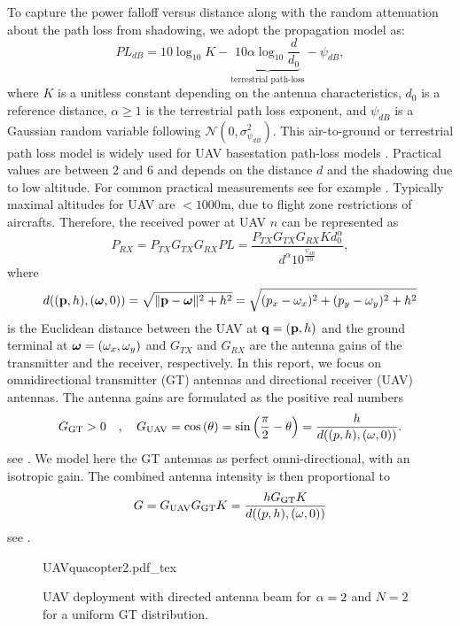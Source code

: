 \documentclass[smallabstract,smallcaptions]{dccpaper}
\newcounter{example}[section]
\newcommand{\GGT}{\ensuremath{G_{\text{GT}}}}         %
\newcommand{\GUAV}{\ensuremath{G_{\text{UAV}}}}         %
\begin{document}
To capture the power
falloff versus distance along with the random attenuation about the path loss from shadowing, we adopt the propagation
model \cite[(2.51)]{AG} as:
%
\begin{equation}
  PL_{dB}=10\log_{10}{K}-\underbrace{10\alpha\log_{10}{\frac{d}{d_0}}}_{\text{terrestrial path-loss}}-\psi_{dB},
\end{equation}
%
where $K$ is a unitless constant depending on the antenna characteristics, $d_0$ is a reference distance, $\alpha\geq 1$
is the terrestrial path loss exponent, and $\psi_{dB}$ is a Gaussian random variable following
$\mathcal{N}\left(0,\sigma^2_{\psi_{dB}}\right)$. This air-to-ground or terrestrial path loss model is widely used for
UAV basestation path-loss models \cite{MSBD16a}. Practical values are between $2$ and $6$ and depends on the
distance $d$ and the shadowing due to low altitude.  For common practical measurements see for example \cite{AG18}.
Typically maximal altitudes for UAV are $<1000$m, due to flight zone restrictions of aircrafts.
Therefore, the received power at UAV $n$ can be represented as
%
\begin{equation}
  P_{RX}=P_{TX}G_{TX}G_{RX}PL=\frac{P_{TX}G_{TX}G_{RX}Kd^{\alpha}_0}{d^{\alpha}10^{\frac{\psi_{dB}}{10}}}, \label{eq:Prx}
\end{equation}
%
where 
%
\begin{align}
  d(({\mathbf p},h),(\boldsymbol{ \omega},0))=\sqrt{\|{\mathbf p}-\boldsymbol{ \omega}\|^2+h^2}=\sqrt{(p_{x}-\omega_x)^2+(p_{y}-\omega_y)^2+h^2}\label{eq:eucd}
\end{align}
%
is the Euclidean distance between the UAV at ${\mathbf q}=({\mathbf p},h)$ and the ground terminal at $\boldsymbol{ \omega}=(\omega_x, \omega_y)$ and
$G_{TX}$ and $G_{RX}$ are the antenna gains of the transmitter and the receiver, respectively.  In this report, we focus
on omnidirectional transmitter (GT) antennas and directional receiver (UAV) antennas.  The antenna gains are formulated
as the positive real numbers 
%
\begin{equation}
\GGT >0\quad,\quad
  \GUAV = \cos\left(\theta\right)=\sin\left(\frac{\pi}{2}-\theta\right)=\frac{h}{d((p,h),(\ome,0))}.
\label{eq:Gdirected}
\end{equation}
%
see \cite[pp.52]{Bal05}. We model here the GT antennas as perfect omni-directional, with an isotropic gain. 
The combined antenna intensity is then proportional to
%
\begin{align}
  G=\GUAV \GGT K=\frac{h \GGT K}{d((p,h),(\ome,0))}
\end{align}
%
see .
%
\begin{figure}
  \centering
  \def\svgwidth{.9\textwidth} \scriptsize{
    {UAVquacopter2.pdf_tex}}
    \caption{UAV deployment with directed antenna beam for $\alpha=2$ and $N=2$ for a uniform GT distribution.}
    \label{fig:uavdirected}
\end{figure}
\end{document}
